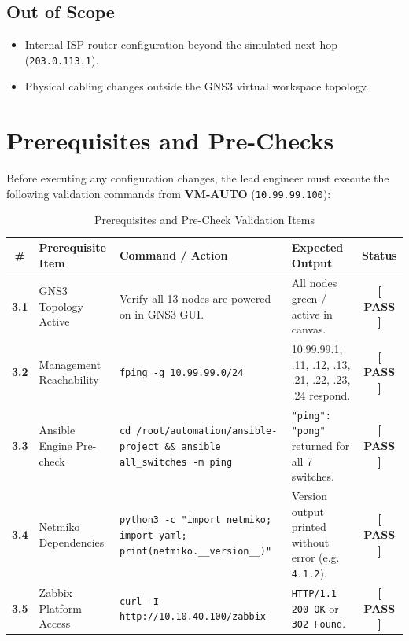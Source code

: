 \documentclass[11pt,a4paper]{article}
\newcommand{\hr}{\vspace{0.2cm}\noindent\hrulefill\vspace{0.2cm}}
\newcommand{\cmark}{\textcolor{green!60!black}{\textbf{[ PASS ]}}}
\begin{document}
\subsection{Out of Scope}
\begin{itemize}
    \item Internal ISP router configuration beyond the simulated next-hop (\texttt{203.0.113.1}).
    \item Physical cabling changes outside the GNS3 virtual workspace topology.
\end{itemize}

\hr

\section{Prerequisites and Pre-Checks}

Before executing any configuration changes, the lead engineer must execute the following validation commands from \textbf{VM-AUTO} (\texttt{10.99.99.100}):

\begin{table}[htbp]
\centering
\caption{Prerequisites and Pre-Check Validation Items}
\label{tab:prereqs}
\scriptsize
\begin{tabularx}{\textwidth}{@{}c p{2.6cm} L L c@{}}
\toprule
\textbf{\#} & \textbf{Prerequisite Item} & \textbf{Command / Action} & \textbf{Expected Output} & \textbf{Status} \\
\midrule
\textbf{3.1} & GNS3 Topology Active & Verify all 13 nodes are powered on in GNS3 GUI. & All nodes green / active in canvas. & \cmark \\
\midrule
\textbf{3.2} & Management Reachability & \texttt{fping -g 10.99.99.0/24} & 10.99.99.1, .11, .12, .13, .21, .22, .23, .24 respond. & \cmark \\
\midrule
\textbf{3.3} & Ansible Engine Pre-check & \texttt{cd /root/automation/ansible-project \&\& ansible all\_switches -m ping} & \texttt{"ping": "pong"} returned for all 7 switches. & \cmark \\
\midrule
\textbf{3.4} & Netmiko Dependencies & \texttt{python3 -c "import netmiko; import yaml; print(netmiko.\_\_version\_\_)"} & Version output printed without error (e.g. \texttt{4.1.2}). & \cmark \\
\midrule
\textbf{3.5} & Zabbix Platform Access & \texttt{curl -I http://10.10.40.100/zabbix} & \texttt{HTTP/1.1 200 OK} or \texttt{302 Found}. & \cmark \\
\bottomrule
\end{tabularx}
\end{table}
\end{document}
